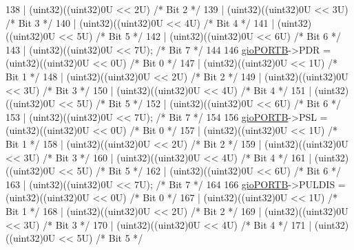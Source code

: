\begin{DoxyCode}
138                    | (uint32)((uint32)0U << 2U)  \textcolor{comment}{/* Bit 2 */}
139                    | (uint32)((uint32)0U << 3U)  \textcolor{comment}{/* Bit 3 */}
140                    | (uint32)((uint32)0U << 4U)  \textcolor{comment}{/* Bit 4 */}
141                    | (uint32)((uint32)0U << 5U)  \textcolor{comment}{/* Bit 5 */}
142                    | (uint32)((uint32)0U << 6U)  \textcolor{comment}{/* Bit 6 */}
143                    | (uint32)((uint32)0U << 7U); \textcolor{comment}{/* Bit 7 */}
144 
146     \mbox{\hyperlink{reg__gio_8h_af0da6a4cad272dcfc7922ff5a5fc30cb}{gioPORTB}}->PDR  = (uint32)((uint32)0U << 0U)  \textcolor{comment}{/* Bit 0 */}
147                    | (uint32)((uint32)0U << 1U)  \textcolor{comment}{/* Bit 1 */}
148                    | (uint32)((uint32)0U << 2U)  \textcolor{comment}{/* Bit 2 */}
149                    | (uint32)((uint32)0U << 3U)  \textcolor{comment}{/* Bit 3 */}
150                    | (uint32)((uint32)0U << 4U)  \textcolor{comment}{/* Bit 4 */}
151                    | (uint32)((uint32)0U << 5U)  \textcolor{comment}{/* Bit 5 */}
152                    | (uint32)((uint32)0U << 6U)  \textcolor{comment}{/* Bit 6 */}
153                    | (uint32)((uint32)0U << 7U); \textcolor{comment}{/* Bit 7 */}
154 
156     \mbox{\hyperlink{reg__gio_8h_af0da6a4cad272dcfc7922ff5a5fc30cb}{gioPORTB}}->PSL  = (uint32)((uint32)0U << 0U)  \textcolor{comment}{/* Bit 0 */}
157                    | (uint32)((uint32)0U << 1U)  \textcolor{comment}{/* Bit 1 */}
158                    | (uint32)((uint32)0U << 2U)  \textcolor{comment}{/* Bit 2 */}
159                    | (uint32)((uint32)0U << 3U)  \textcolor{comment}{/* Bit 3 */}
160                    | (uint32)((uint32)0U << 4U)  \textcolor{comment}{/* Bit 4 */}
161                    | (uint32)((uint32)0U << 5U)  \textcolor{comment}{/* Bit 5 */}
162                    | (uint32)((uint32)0U << 6U)  \textcolor{comment}{/* Bit 6 */}
163                    | (uint32)((uint32)0U << 7U); \textcolor{comment}{/* Bit 7 */}
164 
166     \mbox{\hyperlink{reg__gio_8h_af0da6a4cad272dcfc7922ff5a5fc30cb}{gioPORTB}}->PULDIS  = (uint32)((uint32)0U << 0U) \textcolor{comment}{/* Bit 0 */}
167                       | (uint32)((uint32)0U << 1U)  \textcolor{comment}{/* Bit 1 */}
168                       | (uint32)((uint32)0U << 2U)  \textcolor{comment}{/* Bit 2 */}
169                       | (uint32)((uint32)0U << 3U)  \textcolor{comment}{/* Bit 3 */}
170                       | (uint32)((uint32)0U << 4U)  \textcolor{comment}{/* Bit 4 */}
171                       | (uint32)((uint32)0U << 5U)  \textcolor{comment}{/* Bit 5 */}

\end{DoxyCode}
